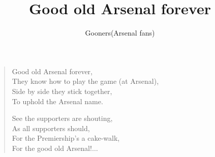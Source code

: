 \documentclass[a4paper,12pt]{article}
\title{Good old Arsenal forever}
\author{Gooners(Arsenal fans)}
\date{}
\begin{document}
	
	\maketitle
	
	\begin{verse}
		
		Good old Arsenal forever, \\
		They know how to play the game (at Arsenal), \\
		Side by side they stick together, \\
		To uphold the Arsenal name. \par
		See the supporters are shouting, \\
		As all supporters should, \\
		For the Premiership's a cake-walk, \\
		For the good old Arsenal!$\ldots$
		
	\end{verse}
	
\end{document}
